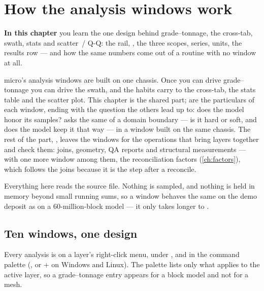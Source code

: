 \chapter{How the analysis windows work}\label{ch:analysis}
\begin{goals}
\textbf{In this chapter} you learn the one design behind grade–tonnage, the cross-tab, swath, stats and scatter~/ Q-Q: the rail, , the three scopes, series, units, the results row — and how the same numbers come out of a routine with no window at all.
\end{goals}

micro's analysis windows are built on one chassis. Once you can drive grade–tonnage you can drive the swath, and the habits carry to the cross-tab, the stats table and the scatter plot. This chapter is the shared part;  are the particulars of each window, ending with the question the others lead up to: does the model honor its samples?  asks the same of a domain boundary — is it hard or soft, and does the model keep it that way — in a window built on the same chassis. The rest of the part, , leaves the windows for the operations that bring layers together and check them: joins, geometry, QA reports and structural measurements — with one more window among them, the reconciliation factors (\cref{ch:factors}), which follows the joins because it is the step after a reconcile.

Everything here reads the source file. Nothing is sampled, and nothing is held in memory beyond small running sums, so a window behaves the same on the demo deposit as on a 60-million-block model — it only takes longer to .

\section{Ten windows, one design}\label{sec:analysis-windows}
Every analysis is on a layer's right-click menu, under , and in the command palette (, or + on Windows and Linux). The palette lists only what applies to the active layer, so a grade–tonnage entry appears for a block model and not for a mesh.

